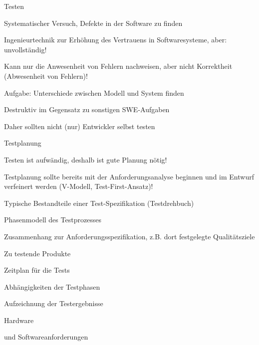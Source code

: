\documentclass[a4paper]{article}
\begin{document}
\begin{multicols}{3}
  Testen
  \begin{itemize*}
    \item Systematischer Versuch, Defekte in der Software zu finden
    \item Ingenieurtechnik zur Erhöhung des Vertrauens in Softwaresysteme, aber: unvollständig!
    \begin{itemize*}
      \item Kann nur die Anwesenheit von Fehlern nachweisen, aber nicht Korrektheit (Abwesenheit von Fehlern)!
    \end{itemize*}
    \item Aufgabe: Unterschiede zwischen Modell und System finden
    \item Destruktiv im Gegensatz zu sonstigen SWE-Aufgaben
    \begin{itemize*}
      \item Daher sollten nicht (nur) Entwickler selbst testen
    \end{itemize*}
  \end{itemize*}

  Testplanung
  \begin{itemize*}
    \item Testen ist aufwändig, deshalb ist gute Planung nötig!
    \item Testplanung sollte bereits mit der Anforderungsanalyse beginnen und im Entwurf verfeinert werden (V-Modell, Test-First-Ansatz)!
    \item Typische Bestandteile einer Test-Spezifikation (Testdrehbuch)
    \begin{itemize*}
      \item Phasenmodell des Testprozesses
      \item Zusammenhang zur Anforderungsspezifikation, z.B. dort festgelegte Qualitätsziele
      \item Zu testende Produkte
      \item Zeitplan für die Tests
      \item Abhängigkeiten der Testphasen
      \item Aufzeichnung der Testergebnisse
      \item Hardware\item und Softwareanforderungen
    \end{itemize*}
  \end{itemize*}


\end{multicols}
\end{document}
